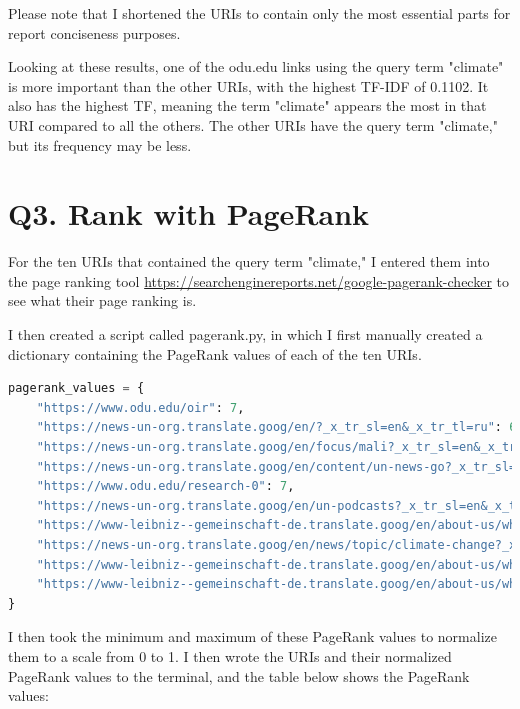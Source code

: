 \documentclass[12pt]{article}
\begin{document}
Please note that I shortened the URIs to contain only the most essential parts for report conciseness purposes.

Looking at these results, one of the odu.edu links using the query term "climate" is more important than the other URIs, with the highest TF-IDF of 0.1102. It also has the highest TF, meaning the term "climate" appears the most in that URI compared to all the others. The other URIs have the query term "climate," but its frequency may be less.

\section*{Q3. Rank with PageRank}

For the ten URIs that contained the query term "climate," I entered them into the page ranking tool \url{https://searchenginereports.net/google-pagerank-checker} to see what their page ranking is.

I then created a script called pagerank.py, in which I first manually created a dictionary containing the PageRank values of each of the ten URIs.

\begin{lstlisting}[language=Python]
pagerank_values = {
    "https://www.odu.edu/oir": 7,
    "https://news-un-org.translate.goog/en/?_x_tr_sl=en&_x_tr_tl=ru": 6,
    "https://news-un-org.translate.goog/en/focus/mali?_x_tr_sl=en&_x_tr_tl=ru": 6,
    "https://news-un-org.translate.goog/en/content/un-news-go?_x_tr_sl=en&_x_tr_tl=ru": 6,
    "https://www.odu.edu/research-0": 7,
    "https://news-un-org.translate.goog/en/un-podcasts?_x_tr_sl=en&_x_tr_tl=ru": 6,
    "https://www-leibniz--gemeinschaft-de.translate.goog/en/about-us/whats-new/news/forschungsnachrichten-single/newsdetails/solidaritaet-mit-der-ukraine?_x_tr_sl=en&_x_tr_tl=uk": 0,
    "https://news-un-org.translate.goog/en/news/topic/climate-change?_x_tr_sl=en&_x_tr_tl=ru": 6,
    "https://www-leibniz--gemeinschaft-de.translate.goog/en/about-us/whats-new/news/forschungsnachrichten-single/newsdetails/solidaritaet-mit-der-ukraine?_x_tr_sl=en&_x_tr_tl=ru": 0,
    "https://www-leibniz--gemeinschaft-de.translate.goog/en/about-us/whats-new/news?_x_tr_sl=en&_x_tr_tl=uk": 0,
}
\end{lstlisting}

I then took the minimum and maximum of these PageRank values to normalize them to a scale from 0 to 1. I then wrote the URIs and their normalized PageRank values to the terminal, and the table below shows the PageRank values:
\end{document}
